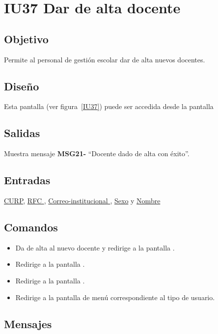 
\section{IU37 Dar de alta docente}
\subsection{Objetivo}
    Permite al personal de gestión escolar dar de alta nuevos docentes.
\subsection{Diseño}
    Esta pantalla  (ver figura~\ref{IU37}) puede ser accedida desde la pantalla 

\subsection{Salidas}
Muestra mensaje {\bf MSG21-} ``Docente dado de alta con éxito''.
\subsection{Entradas}
\hyperlink{Docente.CURP }{CURP}, \hyperlink{Docente.RFC }{RFC }, \hyperlink{Docente.Correo-institucional}{ Correo-institucional }, \hyperlink{Docente.Sexo}{Sexo} y \hyperlink{ Docente.Nombre}{Nombre}
\subsection{Comandos}
\begin{itemize}
    \item {} Da de alta al nuevo docente y redirige a la pantalla .
    \item {} Redirige a la pantalla .
    \item {} Redirige a la pantalla .
    \item {} Redirige a la pantalla de menú correspondiente al tipo de usuario.
    
\end{itemize}

\subsection{Mensajes}

